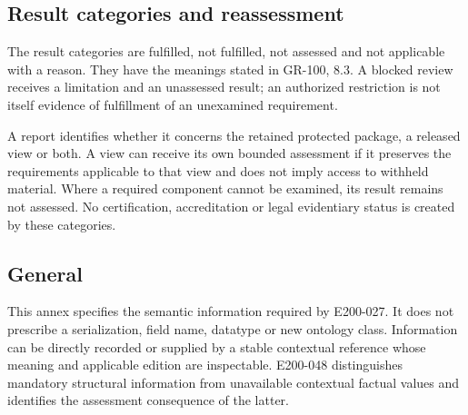 \documentclass[11pt,a4paper]{article}
\begin{document}
\subsection{Result categories and reassessment}
The result categories are fulfilled, not fulfilled, not assessed and not applicable with a reason. They have the meanings stated in GR-100, 8.3. A blocked review receives a limitation and an unassessed result; an authorized restriction is not itself evidence of fulfillment of an unexamined requirement.


A report identifies whether it concerns the retained protected package, a released view or both. A view can receive its own bounded assessment if it preserves the requirements applicable to that view and does not imply access to withheld material. Where a required component cannot be examined, its result remains not assessed. No certification, accreditation or legal evidentiary status is created by these categories.
\subsection{General}
This annex specifies the semantic information required by E200-027. It does not prescribe a serialization, field name, datatype or new ontology class. Information can be directly recorded or supplied by a stable contextual reference whose meaning and applicable edition are inspectable. E200-048 distinguishes mandatory structural information from unavailable contextual factual values and identifies the assessment consequence of the latter.

\end{document}
